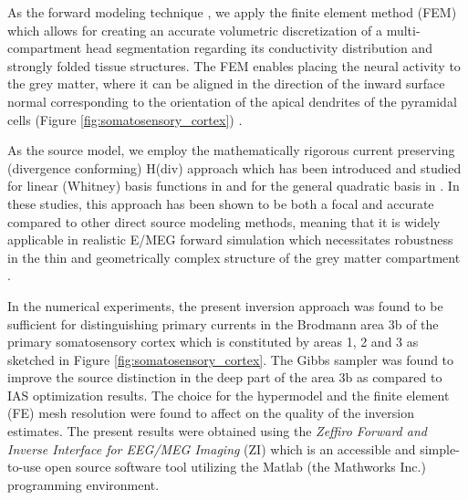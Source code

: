 \documentclass[5p]{elsarticle}
\begin{document}
As the forward modeling technique \citep{demunck2012}, we apply the finite element method (FEM) \cite{braess2001,CHW:Hau2002,CHW:Ram2006}
which allows for creating an accurate volumetric discretization of a multi-compartment head segmentation  regarding its conductivity distribution and strongly folded tissue structures. The FEM enables placing the neural activity to the grey matter, where it can be aligned in the direction of the inward surface normal corresponding to the orientation of the apical dendrites of the 
pyramidal cells (Figure \ref{fig:somatosensory_cortex}) \citep{creutzfeldt1962influence,hari2018ifcn,hallez2007review}. 



As the source model, we employ the mathematically rigorous current preserving (divergence conforming) H(div) approach which has been introduced and studied for linear (Whitney) basis functions in \citep{bauer2015} and for the general quadratic basis in \citep{pursiainen2016}. In these studies, this approach has been shown to be both a focal and accurate compared to other direct source modeling methods, meaning that it is widely applicable in realistic E/MEG forward simulation \citep{vorwerk2014guideline} which necessitates robustness in the thin and geometrically complex structure of the grey matter compartment \citep{griffis2016age,mcginnis2011age,fischl2000measuring}. 

In the numerical experiments, the present inversion approach was found to be sufficient for distinguishing primary currents in the Brodmann area 3b \citep{brodmann1909vergleichende}  of the primary somatosensory cortex which is constituted by areas 1, 2 and 3 as sketched in Figure \ref{fig:somatosensory_cortex}. The  Gibbs sampler \cite{elliott1984application} was found to improve the source distinction in the deep part of the area 3b as compared to IAS optimization results. The choice for the hypermodel and the finite element (FE) mesh resolution were found to affect on the quality of the inversion estimates. The present results were obtained using the  {\em Zeffiro Forward and Inverse Interface for EEG/MEG Imaging} \cite{ZeffiroInterface} (ZI) which is an accessible and simple-to-use open source software tool utilizing the Matlab (the Mathworks Inc.) programming environment.
\end{document}
